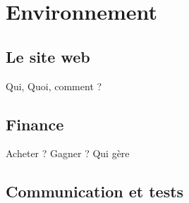 \section{Environnement}
\subsection{Le site web}
Qui, Quoi, comment ?

\subsection{Finance}
Acheter ? Gagner ? Qui gère

\subsection{Communication et tests}